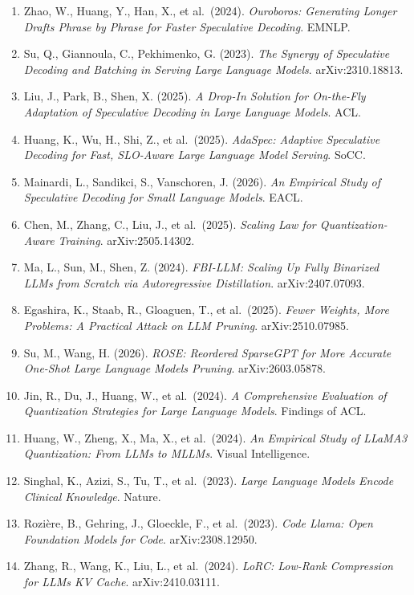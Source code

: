 \begin{enumerate}
  Wang, J., Su, Y., Li, J., et al.~(2025). \emph{OPT-Tree: Speculative Decoding with Adaptive Draft Tree Structure}. TACL.
\item
  Zhao, W., Huang, Y., Han, X., et al.~(2024). \emph{Ouroboros: Generating Longer Drafts Phrase by Phrase for Faster Speculative Decoding}. EMNLP.
\item
  Su, Q., Giannoula, C., Pekhimenko, G. (2023). \emph{The Synergy of Speculative Decoding and Batching in Serving Large Language Models}. arXiv:2310.18813.
\item
  Liu, J., Park, B., Shen, X. (2025). \emph{A Drop-In Solution for On-the-Fly Adaptation of Speculative Decoding in Large Language Models}. ACL.
\item
  Huang, K., Wu, H., Shi, Z., et al.~(2025). \emph{AdaSpec: Adaptive Speculative Decoding for Fast, SLO-Aware Large Language Model Serving}. SoCC.
\item
  Mainardi, L., Sandikci, S., Vanschoren, J. (2026). \emph{An Empirical Study of Speculative Decoding for Small Language Models}. EACL.
\item
  Chen, M., Zhang, C., Liu, J., et al.~(2025). \emph{Scaling Law for Quantization-Aware Training}. arXiv:2505.14302.
\item
  Ma, L., Sun, M., Shen, Z. (2024). \emph{FBI-LLM: Scaling Up Fully Binarized LLMs from Scratch via Autoregressive Distillation}. arXiv:2407.07093.
\item
  Egashira, K., Staab, R., Gloaguen, T., et al.~(2025). \emph{Fewer Weights, More Problems: A Practical Attack on LLM Pruning}. arXiv:2510.07985.
\item
  Su, M., Wang, H. (2026). \emph{ROSE: Reordered SparseGPT for More Accurate One-Shot Large Language Models Pruning}. arXiv:2603.05878.
\item
  Jin, R., Du, J., Huang, W., et al.~(2024). \emph{A Comprehensive Evaluation of Quantization Strategies for Large Language Models}. Findings of ACL.
\item
  Huang, W., Zheng, X., Ma, X., et al.~(2024). \emph{An Empirical Study of LLaMA3 Quantization: From LLMs to MLLMs}. Visual Intelligence.
\item
  Singhal, K., Azizi, S., Tu, T., et al.~(2023). \emph{Large Language Models Encode Clinical Knowledge}. Nature.
\item
  Rozière, B., Gehring, J., Gloeckle, F., et al.~(2023). \emph{Code Llama: Open Foundation Models for Code}. arXiv:2308.12950.
\item
  Zhang, R., Wang, K., Liu, L., et al.~(2024). \emph{LoRC: Low-Rank Compression for LLMs KV Cache}. arXiv:2410.03111.

\end{enumerate}
